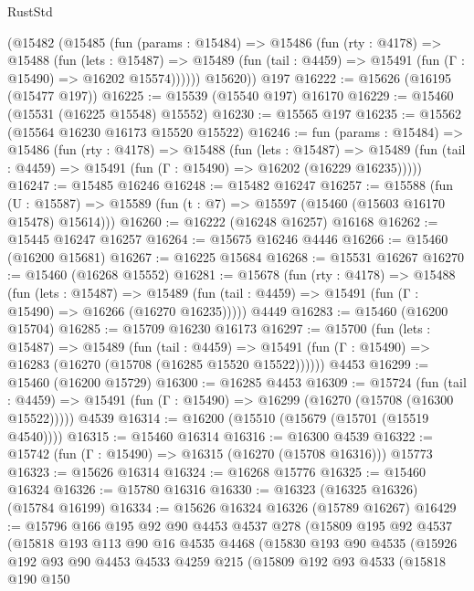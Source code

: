 \begin{lexlean}{RustStd}
\begin{coremodule}
      (@15482
        (@15485
          (fun (params : @15484) =>
          @15486
            (fun (rty : @4178) =>
            @15488
              (fun (lets : @15487) =>
              @15489 (fun (tail : @4459) => @15491 (fun (Γ : @15490) => @16202 @15574))))))
        @15620))
    @197
@16222 := @15626 (@16195 (@15477 @197))
@16225 := @15539 (@15540 @197) @16170
@16229 := @15460 (@15531 (@16225 @15548) @15552)
@16230 := @15565 @197
@16235 := @15562 (@15564 @16230 @16173 @15520 @15522)
@16246 := fun (params : @15484) =>
  @15486
    (fun (rty : @4178) =>
    @15488
      (fun (lets : @15487) =>
      @15489 (fun (tail : @4459) => @15491 (fun (Γ : @15490) => @16202 (@16229 @16235)))))
@16247 := @15485 @16246
@16248 := @15482 @16247
@16257 := @15588
    (fun (U : @15587) => @15589 (fun (t : @7) => @15597 (@15460 (@15603 @16170 @15478) @15614)))
@16260 := @16222 (@16248 @16257) @16168
@16262 := @15445 @16247 @16257
@16264 := @15675 @16246 @4446
@16266 := @15460 (@16200 @15681)
@16267 := @16225 @15684
@16268 := @15531 @16267
@16270 := @15460 (@16268 @15552)
@16281 := @15678
    (fun (rty : @4178) =>
    @15488
      (fun (lets : @15487) =>
      @15489 (fun (tail : @4459) => @15491 (fun (Γ : @15490) => @16266 (@16270 @16235)))))
    @4449
@16283 := @15460 (@16200 @15704)
@16285 := @15709 @16230 @16173
@16297 := @15700
    (fun (lets : @15487) =>
    @15489
      (fun (tail : @4459) =>
      @15491 (fun (Γ : @15490) => @16283 (@16270 (@15708 (@16285 @15520 @15522))))))
    @4453
@16299 := @15460 (@16200 @15729)
@16300 := @16285 @4453
@16309 := @15724
    (fun (tail : @4459) => @15491 (fun (Γ : @15490) => @16299 (@16270 (@15708 (@16300 @15522)))))
    @4539
@16314 := @16200 (@15510 (@15679 (@15701 (@15519 @4540))))
@16315 := @15460 @16314
@16316 := @16300 @4539
@16322 := @15742 (fun (Γ : @15490) => @16315 (@16270 (@15708 @16316))) @15773
@16323 := @15626 @16314
@16324 := @16268 @15776
@16325 := @15460 @16324
@16326 := @15780 @16316
@16330 := @16323 (@16325 @16326) (@15784 @16199)
@16334 := @15626 @16324 @16326 (@15789 @16267)
@16429 := @15796
    @166
    @195
    @92
    @90
    @4453
    @4537
    @278
    (@15809
      @195
      @92
      @4537
      (@15818
        @193
        @113
        @90
        @16
        @4535
        @4468
        (@15830
          @193
          @90
          @4535
          (@15926
            @192
            @93
            @90
            @4453
            @4533
            @4259
            @215
            (@15809
              @192
              @93
              @4533
              (@15818
                @190
                @150

\end{coremodule}
\end{lexlean}
